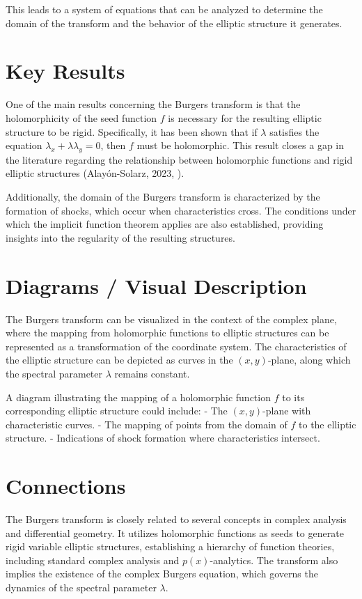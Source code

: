 \documentclass[11pt,a4paper]{article}
\begin{document}
This leads to a system of equations that can be analyzed to determine the domain of the transform and the behavior of the elliptic structure it generates.

\section{Key Results}
One of the main results concerning the Burgers transform is that the holomorphicity of the seed function \( f \) is necessary for the resulting elliptic structure to be rigid. Specifically, it has been shown that if \( \lambda \) satisfies the equation \( \lambda_x + \lambda \lambda_y = 0 \), then \( f \) must be holomorphic. This result closes a gap in the literature regarding the relationship between holomorphic functions and rigid elliptic structures (Alayón-Solarz, 2023, \cite{2602.19251v1}).

Additionally, the domain of the Burgers transform is characterized by the formation of shocks, which occur when characteristics cross. The conditions under which the implicit function theorem applies are also established, providing insights into the regularity of the resulting structures.

\section{Diagrams / Visual Description}
The Burgers transform can be visualized in the context of the complex plane, where the mapping from holomorphic functions to elliptic structures can be represented as a transformation of the coordinate system. The characteristics of the elliptic structure can be depicted as curves in the \( (x, y) \)-plane, along which the spectral parameter \( \lambda \) remains constant. 

A diagram illustrating the mapping of a holomorphic function \( f \) to its corresponding elliptic structure could include:
- The \( (x, y) \)-plane with characteristic curves.
- The mapping of points from the domain of \( f \) to the elliptic structure.
- Indications of shock formation where characteristics intersect.

\section{Connections}
The Burgers transform is closely related to several concepts in complex analysis and differential geometry. It utilizes holomorphic functions as seeds to generate rigid variable elliptic structures, establishing a hierarchy of function theories, including standard complex analysis and \( p(x) \)-analytics. The transform also implies the existence of the complex Burgers equation, which governs the dynamics of the spectral parameter \( \lambda \).
\end{document}
